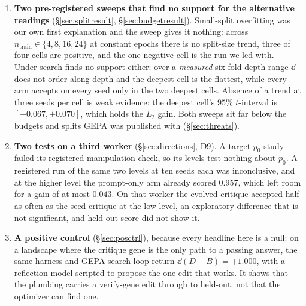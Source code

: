 \documentclass[11pt]{article}
\begin{document}
\begin{enumerate}
    contrast and not a measurement of the treatment. Splitting it into a draft term and a loop
    term, an identity computable offline from the released artifact, shows how unstable the
    attribution is: on the single draws the shared gene carries $-0.025$ of the $-0.042$ and none
    of the $+0.060$, while the mean of five re-measurements puts it at $-0.017$ and $+0.024$.
    Neither term is identified as the treatment, because the arms run separate searches and the
    loop-level arm accepts its two genes' rewrites together. The split also bounds the outcome-side half of the
    mechanism: the stratum the always-\emph{fix} account blames contributes $+0.002$, not the
    deficit.
  \item \textbf{Two pre-registered sweeps that find no support for the alternative readings}
    (\S\ref{sec:splitresult}, \S\ref{sec:budgetresult}). Small-split overfitting was our own
    first explanation and the sweep gives it nothing: across $n_{\mathrm{train}} \in
    \{4,8,16,24\}$ at constant epochs there is no split-size trend, three of four cells are
    positive, and the one negative cell is the run we led with. Under-search finds no support
    either: over a \emph{measured} six-fold depth range $\dd$ does not order along depth and the
    deepest cell is the flattest, while every arm accepts on every seed only in the two deepest
    cells. Absence of a trend at three seeds per cell is weak evidence: the deepest cell's $95\%$
    $t$-interval is $[-0.067,+0.070]$, which holds the $L_2$ gain. Both sweeps sit far below the
    budgets and splits GEPA was published with (\S\ref{sec:threats}).
  \item \textbf{Two tests on a third worker} (\S\ref{sec:directions}, D9). A target-$p_0$ study
    failed its registered manipulation check, so its levels test nothing about $p_0$. A registered
    run of the same two levels at ten seeds each was inconclusive, and at the
    higher level the prompt-only arm already scored $0.957$, which left room for a gain of at most
    $0.043$. On that worker the evolved critique accepted half as often as the seed critique at
    the low level, an exploratory difference that is not significant, and held-out score did not
    show it.
  \item \textbf{A positive control} (\S\ref{sec:posctrl}), because every headline here is a
    null: on a landscape where the critique gene is the only path to a passing answer, the
    same harness and GEPA search loop return $\dd(D-B) = +1.000$, with a reflection model
    scripted to propose the one edit that works. It shows that the plumbing carries a verify-gene
    edit through to held-out, not that the optimizer can find one.
\end{enumerate}
\end{document}

